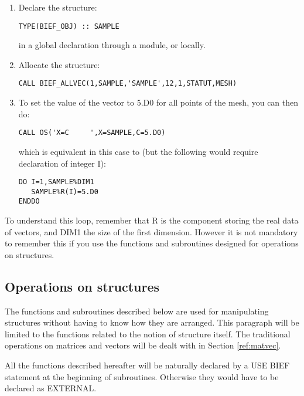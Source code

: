 \begin{enumerate}
  \item Declare the structure:

\begin{lstlisting}[language=TelFortran]
TYPE(BIEF_OBJ) :: SAMPLE
\end{lstlisting}
in a global declaration through a module, or locally.

  \item Allocate the structure:

\begin{lstlisting}[language=TelFortran]
CALL BIEF_ALLVEC(1,SAMPLE,'SAMPLE',12,1,STATUT,MESH)
\end{lstlisting}

  \item To set the value of the vector to 5.D0 for all points of the mesh, you
    can then do:

\begin{lstlisting}[language=TelFortran]
CALL OS('X=C     ',X=SAMPLE,C=5.D0)
\end{lstlisting}
which is equivalent in this case to (but the following would require
declaration of integer I):

\begin{lstlisting}[language=TelFortran]
DO I=1,SAMPLE%DIM1
   SAMPLE%R(I)=5.D0
ENDDO
\end{lstlisting}
\end{enumerate}
To understand this loop, remember that R is the component storing the real data
of vectors, and DIM1 the size of the first dimension. However it is not
mandatory to remember this if you use the functions and subroutines designed
for operations on structures.

\subsection{Operations on structures}

The functions and subroutines described below are used for manipulating
structures without having to know how they are arranged. This paragraph will be
limited to the functions related to the notion of structure itself. The
traditional operations on matrices and vectors will be dealt with in Section
\ref{ref:matvec}.

All the functions described hereafter will be naturally declared by a USE BIEF
statement at the beginning of subroutines. Otherwise they would have to be
declared as EXTERNAL.

